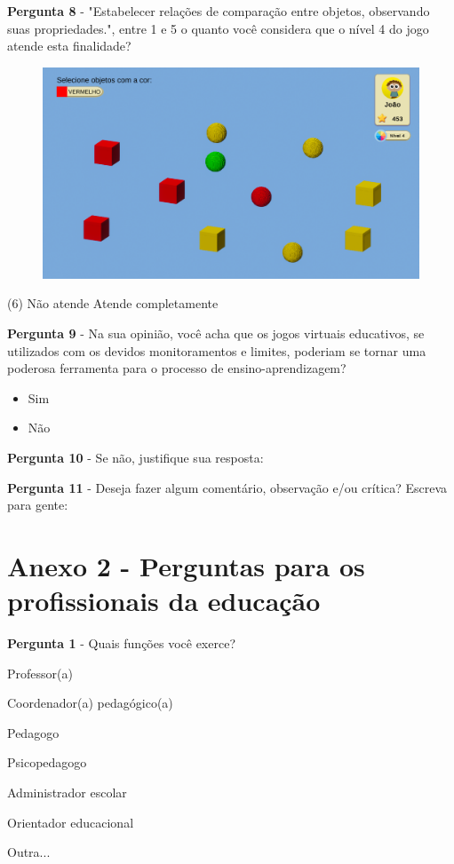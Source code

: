 \documentclass[article,12pt,openany,oneside,a4paper,english,brazil]{abntex2}
\begin{document}
\textbf{Pergunta 8} - "Estabelecer relações de comparação entre objetos, observando suas propriedades.", entre 1 e 5 o quanto você considera que o nível 4 do jogo atende esta finalidade?

\begin{figure}[H]
    \centering
    \label{fig:aluno_pergunta_5}
    \includegraphics[width=0.8\linewidth]{GameScreenshots/Level4.png}
\end{figure}

\normalfont
\begin{tasks}[style=enumerate, item-format={\normalfont\tiny}, after-item-skip=4mm](6)
\task Não atende
\task 
\task 
\task 
\task Atende completamente
\end{tasks}

\textbf{Pergunta 9} - Na sua opinião, você acha que os jogos virtuais educativos, se utilizados com os devidos monitoramentos e limites, poderiam se tornar uma poderosa ferramenta para o processo de ensino-aprendizagem?
\begin{itemize}
     \item Sim
     \item Não
\end{itemize}

\textbf{Pergunta 10} - Se não, justifique sua resposta:

\textbf{Pergunta 11} - Deseja fazer algum comentário, observação e/ou crítica? Escreva para gente:


\section{Anexo 2 - Perguntas para os profissionais da educação}
\label{sc:anexo2}

\textbf{Pergunta 1} - Quais funções você exerce?
\begin{todolist}
     \item Professor(a)
     \item Coordenador(a) pedagógico(a)
     \item Pedagogo
     \item Psicopedagogo
     \item Administrador escolar
     \item Orientador educacional
     \item Outra...
\end{todolist}
\end{document}
